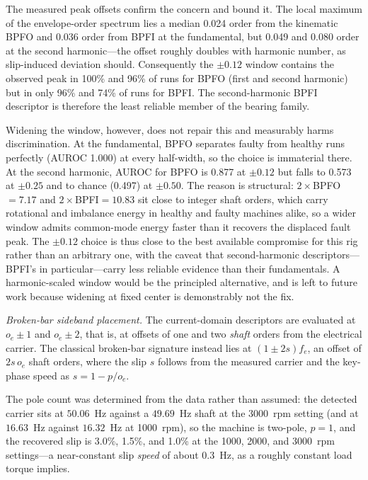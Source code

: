 \documentclass[journal]{IEEEtran}
\begin{document}
The measured peak offsets confirm the concern and bound it. The local maximum
of the envelope-order spectrum lies a median 0.024 order from the kinematic
BPFO and 0.036 order from BPFI at the fundamental, but 0.049 and 0.080 order
at the second harmonic---the offset roughly doubles with harmonic number, as
slip-induced deviation should. Consequently the $\pm0.12$ window contains the
observed peak in 100\% and 96\% of runs for BPFO (first and second harmonic)
but in only 96\% and 74\% of runs for BPFI. The second-harmonic BPFI
descriptor is therefore the least reliable member of the bearing family.

Widening the window, however, does not repair this and measurably harms
discrimination. At the fundamental, BPFO separates faulty from healthy runs
perfectly (AUROC 1.000) at every half-width, so the choice is immaterial
there. At the second harmonic, AUROC for BPFO is 0.877 at $\pm0.12$ but falls
to 0.573 at $\pm0.25$ and to chance (0.497) at $\pm0.50$. The reason is
structural: $2\times$BPFO${}=7.17$ and $2\times$BPFI${}=10.83$ sit close to
integer shaft orders, which carry rotational and imbalance energy in healthy
and faulty machines alike, so a wider window admits common-mode energy faster
than it recovers the displaced fault peak. The $\pm0.12$ choice is thus close
to the best available compromise for this rig rather than an arbitrary one,
with the caveat that second-harmonic descriptors---BPFI's in
particular---carry less reliable evidence than their fundamentals. A
harmonic-scaled window would be the principled alternative, and is left to
future work because widening at fixed center is demonstrably not the fix.

\emph{Broken-bar sideband placement.} The current-domain descriptors are
evaluated at $o_e \pm 1$ and $o_e \pm 2$, that is, at offsets of one and two
\emph{shaft} orders from the electrical carrier. The classical broken-bar
signature instead lies at $(1 \pm 2s) f_e$, an offset of $2 s\, o_e$ shaft
orders, where the slip $s$ follows from the measured carrier and the
key-phase speed as $s = 1 - p/o_e$.

The pole count was determined from the data rather than assumed: the detected
carrier sits at $50.06$~Hz against a $49.69$~Hz shaft at the 3000~rpm setting
(and at $16.63$~Hz against $16.32$~Hz at 1000~rpm), so the machine is
two-pole, $p=1$, and the recovered slip is 3.0\%, 1.5\%, and 1.0\% at the
1000, 2000, and 3000~rpm settings---a near-constant slip \emph{speed} of about
$0.3$~Hz, as a roughly constant load torque implies.
\end{document}
